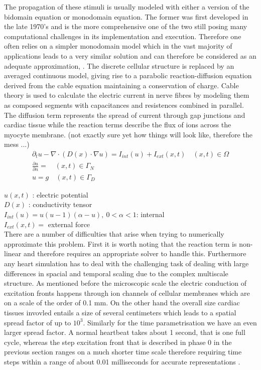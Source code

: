 \documentclass[fleqn, a4paper, 11pt, bibliography=totoc]{report}
\begin{document}
The propagation of these stimuli is usually modeled with either a version of the bidomain equation or monodomain equation. The former was first developed in the late 1970's and is the more comprehensive one of the two still posing many computational challenges in its implementation and execution. Therefore one often relies on a simpler monodomain model which in the vast majority of applications leads to a very similar solution and can therefore be considered as an adequate approximation, \cite{potse2006comparison}. The discrete cellular structure is replaced by an averaged continuous model, giving rise to a parabolic reaction-diffusion equation derived from the cable equation maintaining a conservation of charge. Cable theory is used to calculate the electric current in nerve fibres by modeling them as composed segments with capacitances and resistences combined in parallel. 
The diffusion term represents the spread of current through gap junctions and cardiac tissue while the reaction terms describe the flux of ions across the myocyte membrane.  (not exactly sure yet how things will look like, therefore the mess ...)
\begin{equation}
\begin{aligned}
\partial_t u - \nabla \cdot ( D(x) \cdot \nabla u) = I_{int}(u) + I_{ext}(x,t)  \quad  (x,t) \in \Omega \\
\frac{\partial u}{\partial n} = \quad (x,t) \in \Gamma_N \\
u = g \quad (x,t) \in \Gamma_D
\end{aligned}
\end{equation}

$u(x,t)$ : electric potential \\
$D(x) $  : conductivity tensor \\
$ I_{int}(u) = u (u - 1 )(\alpha - u), \ 0 < \alpha < 1$: internal \\
$I_{ext}(x,t) = $ external force \\

There are a number of difficulties that arise when trying to numerically approximate this problem. First it is worth noting that the reaction term is non-linear and therefore requires an appropriate solver to handle this. Furthermore any heart simulation has to deal with the challenging task of dealing with large differences in spacial and temporal scaling due to the complex multiscale structure. As mentioned before the microscopic scale the electric conduction of excitation fronts happens through ion channels of cellular membranes which are on a scale of the order of 0.1 mm. On the other hand the overall size cardiac tissues invovled entails a size of several centimeters which leads to a spatial spread factor of up to $10^3$. Similarly for the time parametrisation we have an even larger spread factor. A normal heartbeat takes about 1 second, that is one full cycle, whereas the step excitation front that is described in phase 0 in the previous section ranges on a much shorter time scale therefore requiring time steps within a range of about 0.01 milliseconds for accurate representations \cite{colli2004parallel}.



\end{document}
